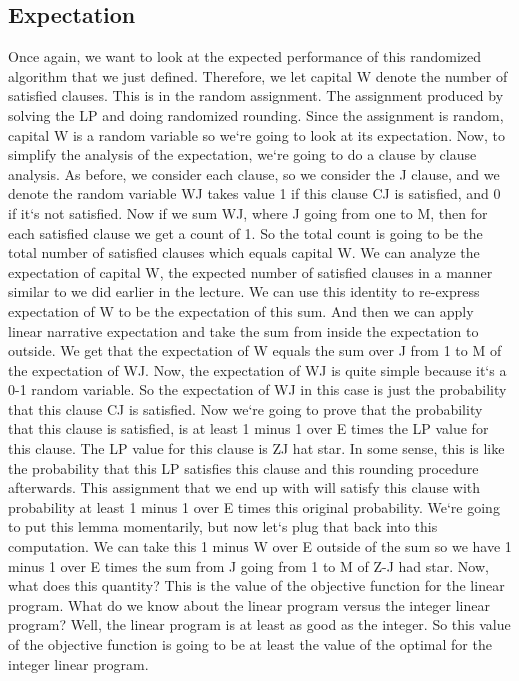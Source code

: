\subsection{Expectation}
Once again, we want to look at the expected performance of this randomized algorithm that we just defined.
Therefore, we let capital W denote the number of satisfied clauses.
This is in the random assignment.
The assignment produced by solving the LP and doing randomized rounding.
Since the assignment is random, capital W is a random variable so we`re going to look at its expectation.
Now, to simplify the analysis of the expectation, we`re going to do a clause by clause analysis.
As before, we consider each clause, so we consider the J clause, and we denote the random variable WJ takes value 1 if this clause CJ is satisfied, and 0 if it`s not satisfied.
Now if we sum WJ, where J going from one to M, then for each satisfied clause we get a count of 1.
So the total count is going to be the total number of satisfied clauses which equals capital W\@.
We can analyze the expectation of capital W, the expected number of satisfied clauses in a manner similar to we did earlier in the lecture.
We can use this identity to re-express expectation of W to be the expectation of this sum.
And then we can apply linear narrative expectation and take the sum from inside the expectation to outside.
We get that the expectation of W equals the sum over J from 1 to M of the expectation of WJ\@.
Now, the expectation of WJ is quite simple because it`s a 0-1 random variable.
So the expectation of WJ in this case is just the probability that this clause CJ is satisfied.
Now we`re going to prove that the probability that this clause is satisfied, is at least 1 minus 1 over E times the LP value for this clause.
The LP value for this clause is ZJ hat star.
In some sense, this is like the probability that this LP satisfies this clause and this rounding procedure afterwards.
This assignment that we end up with will satisfy this clause with probability at least 1 minus 1 over E times this original probability.
We`re going to put this lemma momentarily, but now let`s plug that back into this computation.
We can take this 1 minus W over E outside of the sum so we have 1 minus 1 over E times the sum from J going from 1 to M of Z-J had star.
Now, what does this quantity? This is the value of the objective function for the linear program.
What do we know about the linear program versus the integer linear program? Well, the linear program is at least as good as the integer.
So this value of the objective function is going to be at least the value of the optimal for the integer linear program.
